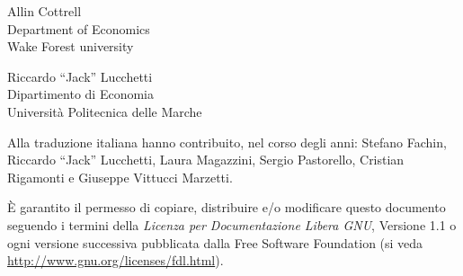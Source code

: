 \documentclass[oneside]{book}
\begin{document}
\VerbatimFootnotes

\setlength{\parindent}{0pt}
\setlength{\parskip}{1ex}


\thispagestyle{empty}

\begin{center}



{\large \sffamily 
Allin Cottrell\\
Department of Economics\\
Wake Forest university

\vspace{20pt}

Riccardo ``Jack'' Lucchetti\\
Dipartimento di Economia\\
Università Politecnica delle Marche\\

\vspace{20pt}


\vspace{20pt} Alla traduzione italiana hanno contribuito, nel corso
degli anni: Stefano Fachin, Riccardo ``Jack'' Lucchetti, Laura
Magazzini, Sergio Pastorello, Cristian Rigamonti e Giuseppe Vittucci
Marzetti.

}

\end{center}
\clearpage


\thispagestyle{empty}


\vspace*{2in}

È garantito il permesso di copiare, distribuire e/o modificare questo
documento seguendo i termini della \emph{Licenza per Documentazione
  Libera GNU}, Versione 1.1 o ogni versione successiva pubblicata
dalla Free Software Foundation (si veda
\url{http://www.gnu.org/licenses/fdl.html}).

\clearpage


\pagestyle{headings}

\tableofcontents

\clearpage
{}





\clearpage

\end{document}

